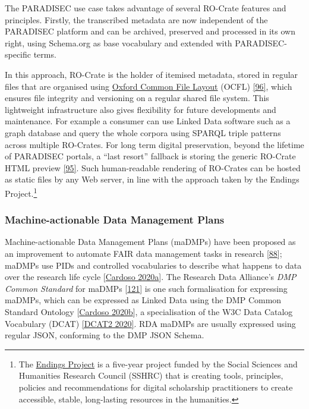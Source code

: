 The PARADISEC use case takes advantage of several RO-Crate features and
principles. Firstly, the transcribed metadata are now independent of the
PARADISEC platform and can be archived, preserved and processed in its
own right, using Schema.org as base vocabulary and extended with
PARADISEC-specific terms.

In this approach, RO-Crate is the holder of itemised metadata, stored in
regular files that are organised using
\href{https://ocfl.io/1.0/spec/}{Oxford Common File Layout} (OCFL)
\href{https://ocfl.io/1.0/spec/}{{[}96{]}}, which ensures file integrity
and versioning on a regular shared file system. This lightweight
infrastructure also gives flexibility for future developments and
maintenance. For example a consumer can use Linked Data software such as
a graph database and query the whole corpora using SPARQL triple
patterns across multiple RO-Crates. For long term digital preservation,
beyond the lifetime of PARADISEC portals, a ``last resort'' fallback is
storing the generic RO-Crate HTML preview
\href{https://www.npmjs.com/package/ro-crate-html-js}{{[}95{]}}. Such
human-readable rendering of RO-Crates can be hosted as static files by
any Web server, in line with the approach taken by the Endings
Project.\footnote{The \href{https://endings.uvic.ca/}{Endings Project}
  is a five-year project funded by the Social Sciences and Humanities
  Research Council (SSHRC) that is creating tools, principles, policies
  and recommendations for digital scholarship practitioners to create
  accessible, stable, long-lasting resources in the humanities.}

\hypertarget{dmp}{%
\subsubsection{Machine-actionable Data Management Plans}\label{dmp}}

Machine-actionable Data Management Plans (maDMPs) have been proposed as
an improvement to automate FAIR data management tasks in research
{[}\href{https://doi.org/10.1371/journal.pcbi.1006750}{88}{]}; maDMPs
use PIDs and controlled vocabularies to describe what happens to data
over the research life cycle
{[}\href{https://doi.org/10.1007/978-3-030-45442-5_15}{Cardoso 2020a}{]}. The
Research Data Alliance's \emph{DMP Common Standard} for maDMPs
{[}\href{https://doi.org/10.15497/rda00039}{121}{]} is one such
formalisation for expressing maDMPs, which can be expressed as Linked
Data using the DMP Common Standard Ontology
{[}\href{https://doi.org/10.4126/frl01-006423289}{Cardoso 2020b}{]}, a
specialisation of the W3C Data Catalog Vocabulary (DCAT)
\href{https://www.w3.org/TR/2020/REC-vocab-dcat-2-20200204/}{{[}DCAT2 2020{]}}.
RDA maDMPs are usually expressed using regular JSON, conforming to the
DMP JSON Schema.

